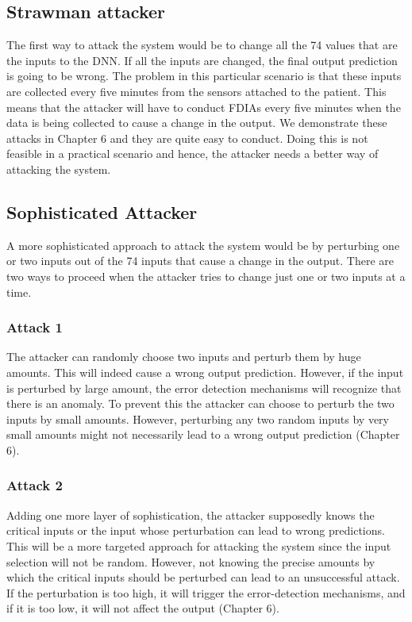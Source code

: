 \subsection{Strawman attacker}
The first way to attack the system would be to change all the 74 values that are the inputs to the DNN.
 If all the inputs are changed, the final output prediction is going to be wrong. The problem in this particular scenario is that 
 these inputs are collected every five minutes from the sensors attached to the patient. 
 This means that the attacker will have to conduct FDIAs every five minutes when the data is being collected to cause a change in the output.
 We demonstrate these attacks in Chapter 6 and they are quite easy to conduct.   
  Doing this is not feasible in a practical scenario and hence, the attacker needs a better way of attacking the system. 

\subsection{Sophisticated Attacker}
A more sophisticated approach to attack the system would be by perturbing one or two inputs out of the 74 inputs that cause a change in the output. There are two ways to proceed when the attacker tries to change just one or two inputs at a time. 

\subsubsection{Attack 1}
The attacker can randomly choose two inputs and perturb them by huge amounts. 
This will indeed cause a wrong output prediction. 
However, if the input is perturbed by large amount, the error detection mechanisms will recognize that there is an anomaly. 
To prevent this the attacker can choose to perturb the two inputs by small amounts. 
However, perturbing any two random inputs by very small amounts might not necessarily lead to a wrong output prediction (Chapter 6).  

\subsubsection{Attack 2}
Adding one more layer of sophistication, the attacker supposedly 
knows the critical inputs or the input whose perturbation can lead to wrong predictions. This will be a more targeted approach for attacking the system since the input selection will not be random. 
However, not knowing the precise amounts by which the critical inputs should be perturbed can lead to an unsuccessful attack. 
If the perturbation is too high, it will trigger the error-detection mechanisms, 
and if it is too low, it will not affect the output (Chapter 6). 

